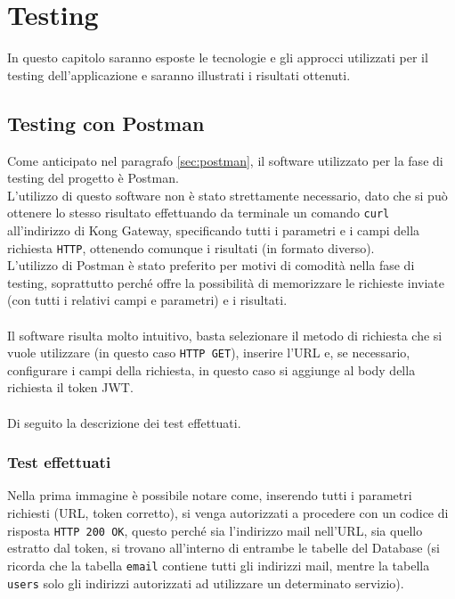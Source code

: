 \chapter{Testing}\label{chapter:testing}

In questo capitolo saranno esposte le tecnologie e gli approcci utilizzati per il testing dell'applicazione e saranno illustrati i risultati ottenuti.

\section{Testing con Postman}\label{sec:test1}
Come anticipato nel paragrafo \ref{sec:postman}, il software utilizzato per la fase di testing del progetto è Postman.\\
L'utilizzo di questo software non è stato strettamente necessario, dato che si può ottenere lo stesso risultato effettuando da terminale un comando \texttt{curl}
all'indirizzo di Kong Gateway, specificando tutti i parametri e i campi della richiesta \texttt{HTTP}, ottenendo comunque i risultati (in formato diverso).\\
L'utilizzo di Postman è stato preferito per motivi di comodità nella fase di testing, soprattutto perché offre la possibilità di memorizzare le richieste inviate 
(con tutti i relativi campi e parametri) e i risultati.\\ \\
Il software risulta molto intuitivo, basta selezionare il metodo di richiesta che si vuole utilizzare (in questo caso \texttt{HTTP GET}), 
inserire l'URL e, se necessario, configurare i campi della richiesta, in questo caso si aggiunge al body della richiesta il token JWT. \cite{Postman}\\ \\

Di seguito la descrizione dei test effettuati.\\

\subsection{Test effettuati}\label{subsec:testeffettuati}

Nella prima immagine è possibile notare come, inserendo tutti i parametri richiesti (URL, token corretto), si venga autorizzati a procedere con un codice di risposta
\texttt{HTTP 200 OK}, questo perché sia l'indirizzo mail nell'URL, sia quello estratto dal token, si trovano all'interno di entrambe le tabelle del Database 
(si ricorda che la tabella \texttt{email} contiene tutti gli indirizzi mail, mentre la tabella \texttt{users} solo gli indirizzi autorizzati ad utilizzare un determinato servizio).

